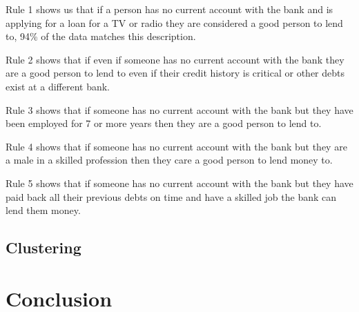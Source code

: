 \documentclass[12pt]{article}
\begin{document}
Rule 1 shows us that if a person has no current account with the bank and is applying for a loan for a TV or radio they are considered a good person to lend to, 94\% of the data matches this description.

Rule 2 shows that if even if someone has no current account with the bank they are a good person to lend to even if their credit history is critical or other debts exist at a different bank.

Rule 3 shows that if someone has no current account with the bank but they have been employed for 7 or more years then they are a good person to lend to.

Rule 4 shows that if someone has no current account with the bank but they are a male in a skilled profession then they care a good person to lend money to.

Rule 5 shows that if someone has no current account with the bank but they have paid back all their previous debts on time and have a skilled job the bank can lend them money.

\subsection{Clustering}

\section{Conclusion}
\end{document}
